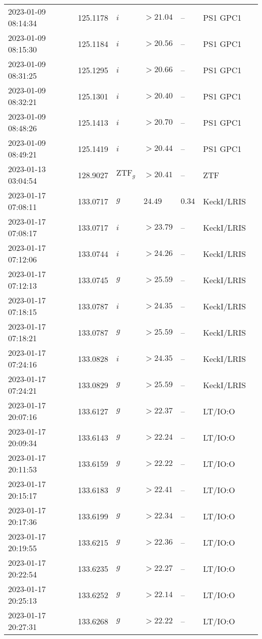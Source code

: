 \documentclass{nature_plusfigure}
\begin{document}
\begin{supplement}
\begin{center}
\begin{longtable}{lllllll}
2023-01-09 08:14:34 & 125.1178 & $i$ & $>21.04$ & -- & PS1 GPC1 &  \\ 
2023-01-09 08:15:30 & 125.1184 & $i$ & $>20.56$ & -- & PS1 GPC1 &  \\ 
2023-01-09 08:31:25 & 125.1295 & $i$ & $>20.66$ & -- & PS1 GPC1 &  \\ 
2023-01-09 08:32:21 & 125.1301 & $i$ & $>20.40$ & -- & PS1 GPC1 &  \\ 
2023-01-09 08:48:26 & 125.1413 & $i$ & $>20.70$ & -- & PS1 GPC1 &  \\ 
2023-01-09 08:49:21 & 125.1419 & $i$ & $>20.44$ & -- & PS1 GPC1 &  \\ 
2023-01-13 03:04:54 & 128.9027 & $\mathrm{ZTF}_{g}$ & $>20.41$ & -- & ZTF &  \\ 
2023-01-17 07:08:11 & 133.0717 & $g$ & $24.49$ & $0.34$ & KeckI/LRIS &  \\ 
2023-01-17 07:08:17 & 133.0717 & $i$ & $>23.79$ & -- & KeckI/LRIS &  \\ 
2023-01-17 07:12:06 & 133.0744 & $i$ & $>24.26$ & -- & KeckI/LRIS &  \\ 
2023-01-17 07:12:13 & 133.0745 & $g$ & $>25.59$ & -- & KeckI/LRIS &  \\ 
2023-01-17 07:18:15 & 133.0787 & $i$ & $>24.35$ & -- & KeckI/LRIS &  \\ 
2023-01-17 07:18:21 & 133.0787 & $g$ & $>25.59$ & -- & KeckI/LRIS &  \\ 
2023-01-17 07:24:16 & 133.0828 & $i$ & $>24.35$ & -- & KeckI/LRIS &  \\ 
2023-01-17 07:24:21 & 133.0829 & $g$ & $>25.59$ & -- & KeckI/LRIS &  \\ 
2023-01-17 20:07:16 & 133.6127 & $g$ & $>22.37$ & -- & LT/IO:O &  \\ 
2023-01-17 20:09:34 & 133.6143 & $g$ & $>22.24$ & -- & LT/IO:O &  \\ 
2023-01-17 20:11:53 & 133.6159 & $g$ & $>22.22$ & -- & LT/IO:O &  \\ 
2023-01-17 20:15:17 & 133.6183 & $g$ & $>22.41$ & -- & LT/IO:O &  \\ 
2023-01-17 20:17:36 & 133.6199 & $g$ & $>22.34$ & -- & LT/IO:O &  \\ 
2023-01-17 20:19:55 & 133.6215 & $g$ & $>22.36$ & -- & LT/IO:O &  \\ 
2023-01-17 20:22:54 & 133.6235 & $g$ & $>22.27$ & -- & LT/IO:O &  \\ 
2023-01-17 20:25:13 & 133.6252 & $g$ & $>22.14$ & -- & LT/IO:O &  \\ 
2023-01-17 20:27:31 & 133.6268 & $g$ & $>22.22$ & -- & LT/IO:O &  \\ 

\end{longtable}
\end{center}
\end{supplement}
\end{document}
